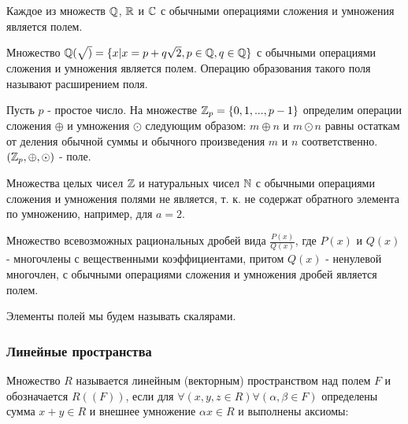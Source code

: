 \begin{primer}
Каждое из множеств $\mathbb{Q}$, $\mathbb{R}$ и $\mathbb{C}$ с обычными операциями сложения и умножения является полем.
\end{primer}

\begin{primer}
Множество $\mathbb{Q}(\sqrt)=\{x|x=p+q\sqrt{2},p\in \mathbb{Q}, q\in\mathbb{Q}\}$ с обычными операциями сложения и умножения является полем. Операцию образования такого поля называют расширением поля.
\end{primer}

\begin{primer}
Пусть $p$ - простое число. На множестве $\mathbb{Z}_p=\{0,1,...,p-1\}$ определим операции сложения $\oplus$ и умножения $\odot$ следующим образом: $m\oplus n$ и $m\odot n$ равны остаткам от деления обычной суммы и обычного произведения $m$ и $n$ соответственно. $(\mathbb{Z}_p,\oplus,\odot)$ - поле.
\end{primer}

\begin{primer}
Множества целых чисел $\mathbb{Z}$ и натуральных чисел $\mathbb{N}$ с обычными операциями сложения и умножения полями не является, т. к. не содержат обратного элемента по умножению, например, для $a=2$.
\end{primer}

\begin{primer}
Множество всевозможных рациональных дробей вида $\frac{P(x)}{Q(x)}$, где $P(x)$ и $Q(x)$ - многочлены с вещественными коэффициентами, притом $Q(x)$ - ненулевой многочлен, с обычными операциями сложения и умножения дробей является полем.
\end{primer}

Элементы полей мы будем называть скалярами.

\subsubsection{Линейные пространства}

\begin{opr}
Множество $R$ называется линейным (векторным) пространством над полем $F$ и обозначается $R((F))$, если для $\forall(x,y,z\in R)\forall(\alpha, \beta \in F)$ определены сумма $x+y\in R$ и внешнее умножение $\alpha x \in R$ и выполнены аксиомы:
\end{opr}

